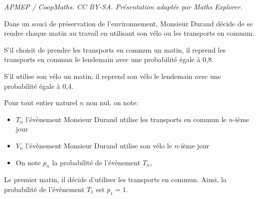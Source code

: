 \documentclass[10pt]{article}
\begin{document}
\noindent\textit{APMEP / CoopMaths. CC BY-SA. Présentation adaptée par Maths Explorer.}\par\medskip
\medskip

Dans un souci de préservation de l'environnement, Monsieur Durand décide de se rendre
chaque matin au travail en utilisant son vélo ou les transports en commun.

S'il choisit de prendre les transports en commun un matin, il reprend les transports en
commun le lendemain avec une probabilité égale à 0,8.

S'il utilise son vélo un matin, il reprend son vélo le lendemain avec une probabilité égale
à 0,4.

\medskip

Pour tout entier naturel $n$ non nul, on note:
\begin{itemize}
\item  $T_n$ l'évènement \og Monsieur Durand utilise les transports en commun le $n$-ième jour\fg
\item  $V_n$ l'évènement \og  Monsieur Durand utilise son vélo le $n$-ième jour\fg
\item On note $p_n$ la probabilité de l'évènement $T_n$,
\end{itemize}

Le premier matin, il décide d'utiliser les transports en commun. Ainsi, la probabilité de
l'évènement $T_1$ est $p_1 = 1$.
\end{document}
